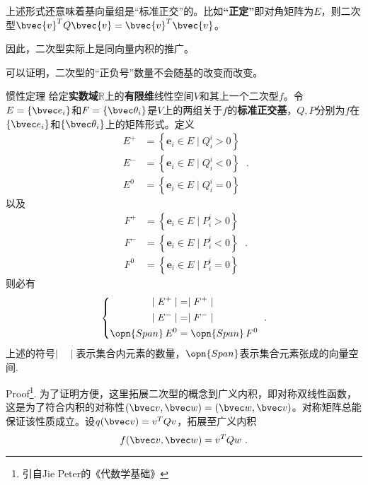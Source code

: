上述形式还意味着基向量组是“标准正交”的。比如\textbf{“正定”}即对角矩阵为$E$，则二次型$\bvec{v}^{T}Q\bvec{v}=\bvec{v}^{T}\bvec{v}$。

因此，二次型实际上是同向量内积的推广。

可以证明，二次型的“正负号”数量不会随基的改变而改变。
\begin{theorem}{惯性定理}
给定\textbf{实数域}$\mathbb R$上的\textbf{有限维}线性空间$V$和其上一个二次型$f$。令$E=\{\bvec e_i\}$和$F=\{\bvec \theta_i\}$是$V$上的两组关于$f$的\textbf{标准正交基}，$Q,P$分别为$f$在$\{\bvec e_i\}$和$\{\bvec \theta_i\}$上的矩阵形式。定义
\begin{equation}
\begin{aligned}
E^{+} & =\left\{\mathbf{e}_i \in E \mid Q^i_i>0\right\} \\
E^{-} & =\left\{\mathbf{e}_i \in E \mid Q^i_i<0\right\} \\
E^0 & =\left\{\mathbf{e}_i \in E \mid Q^i_i=0\right\}
\end{aligned}~.
\end{equation}
以及
\begin{equation}
\begin{aligned}
F^{+} & =\left\{\mathbf{e}_i \in E \mid P^i_i>0\right\} \\
F^{-} & =\left\{\mathbf{e}_i \in E \mid P^i_i<0\right\} \\
F^0 & =\left\{\mathbf{e}_i \in E \mid P^i_i=0\right\}
\end{aligned}~.
\end{equation}
则必有
\begin{equation}
\left\{
\begin{aligned}
\mid E^{+}\mid&=\mid F^{+}\mid\\
\mid E^{-}\mid&=\mid F^{-}\mid\\
\opn{Span}\, E^{0}&=\opn{Span}\, F^{0}\\
\end{aligned}\right.~.
\end{equation}
上述的符号$\mid \quad\mid$表示集合内元素的数量，$\opn{Span}$表示集合元素张成的向量空间.
\end{theorem}
Proof\footnote{引自Jie Peter的《代数学基础》}.
为了证明方便，这里拓展二次型的概念到广义内积，即对称双线性函数，这是为了符合内积的对称性$(\bvec v,\bvec w)=(\bvec w,\bvec v)$。对称矩阵总能保证该性质成立。设$q(\bvec v)=v^T Q v$，拓展至广义内积
\begin{equation}
f(\bvec v,\bvec w)=v^T Q w~.
\end{equation}


